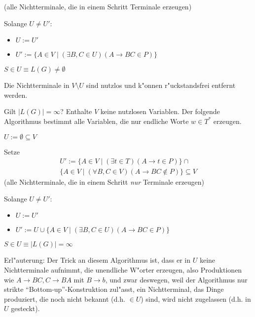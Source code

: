 {\begin{description}
\begin{proc}
          (alle Nichtterminale, die in einem Schritt Terminale erzeugen)
	\item Solange $U\ne U'$: \begin{itemize}
          \item $U:=U'$
	  \item $U':=\{A\in V\mid (\exists B,C\in U)(A\to BC \in P)\}$
          \end{itemize}
        \item $S\in U\equiv L(G)\ne\emptyset$
       	\end{proc}
      Die Nichtterminale in $V\setminus U$ sind nutzlos und k"onnen 
      r"uckstandsfrei entfernt werden.
    \item[Endlichkeit:] Gilt $|L(G)| = \infty$? Enthalte $V$ keine nutzlosen
      Variablen. Der folgende Algorithmus
      bestimmt alle Variablen, die nur endliche Worte $w \in T^*$
      erzeugen.
      \begin{proc}
        \item $U:=\emptyset\subseteq V$
        \item Setze
          \begin{multline*}
	    U':=\{A\in V\mid (\exists t\in T)(A\to t\in P)\}\cap\\
            \{A\in V\mid (\forall B,C\in V)(A\to BC\not\in P)\}\subseteq V
	    \end{multline*}
          (alle Nichtterminale, die in einem Schritt \emph{nur} Terminale erzeugen)
	\item Solange $U\ne U'$: \begin{itemize}
          \item $U:=U'$
	  \item $U':=U\cup \{A\in V\mid (\exists B,C\in U)(A\to BC\in P)\}$
          \end{itemize}
        \item $S\in U\equiv |L(G)|=\infty$ 
        \end{proc}
      Erl"auterung: Der Trick an diesem Algorithmus ist, dass er in $U$ 
      keine Nichtterminale aufnimmt, die unendliche W"orter erzeugen,
      also Produktionen wie $A\to BC,C\to BA$ mit $B\to b$, und zwar deswegen,
      weil der Algorithmus nur strikte ``Bottom-up''-Konstruktion zul"asst,
      ein Nichtterminal, das Dinge produziert, die noch nicht bekannt 
      (d.h. $\in U$) sind, wird nicht zugelassen (d.h. in $U$ gesteckt).
    \end{description}
  }
